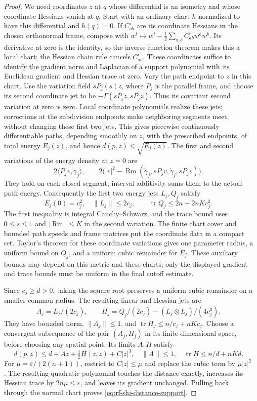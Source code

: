 \begin{proof}
We need coordinates $z$ at $q$ whose differential is an isometry and
whose coordinate Hessians vanish at $q$.  Start with an ordinary chart
$h$ normalized to have this differential and $h(q)=0$.  If $C^i_{ab}$
are its coordinate Hessians in the chosen orthonormal frame, compose
with $w^i\mapsto w^i-\tfrac12\sum_{a,b}C^i_{ab}w^aw^b$.
Its derivative at zero is the identity, so the inverse function theorem
makes this a local chart; the Hessian chain rule cancels $C^i_{ab}$.
These coordinates suffice to identify the gradient norm and Laplacian
of a support polynomial with its Euclidean gradient and Hessian trace
at zero.  Vary the path endpoint to $z$ in this chart.
Use the variation field $sP_j(s)z$, where $P_j$ is the parallel frame,
and choose its second coordinate jet to be
$-\Gamma(sP_jz,sP_jz)$.  Thus its covariant second variation at zero
is zero.  Local coordinate polynomials realize these jets; corrections
at the subdivision endpoints make neighboring segments meet, without
changing these first two jets.  This gives piecewise continuously
differentiable paths, depending smoothly on $z$, with
the prescribed endpoints, of total energy $E_j(z)$, and hence
$d(p,z)\leq\sqrt{E_j(z)}$.  The first and second variations of the
energy density at $z=0$ are
\[
 2\langle P_jv,\dot\gamma_j\rangle,\qquad
 2\bigl(|v|^2-
   \operatorname{Rm}(\dot\gamma_j,sP_jv,\dot\gamma_j,sP_jv)\bigr).
\]
They hold on each closed segment; interval additivity sums them to the
actual path energy.  Consequently the first two energy jets $L_j,Q_j$
satisfy
\[
 E_j(0)=c_j^2,\quad \|L_j\|\leq2c_j,\qquad
 \operatorname{tr}Q_j\leq2n+2nKc_j^2.
\]
The first inequality is integral Cauchy--Schwarz, and the trace bound
uses $0\leq s\leq1$ and $|\operatorname{Rm}|\leq K$ in the second
variation.  The finite chart cover and bounded path speeds and frame
matrices put the coordinate data in a compact set.  Taylor's theorem
for these coordinate variations gives one parameter radius, a uniform
bound on $Q_j$, and a uniform cubic remainder for $E_j$.  These auxiliary
bounds may depend on this metric and these charts; only the displayed
gradient and trace bounds must be uniform in the final cutoff estimate.

Since $c_j\geq d>0$, taking the square root preserves a uniform cubic
remainder on a smaller common radius.  The resulting linear and Hessian
jets are
\[
 A_j=L_j/(2c_j),\qquad
 H_j=Q_j/(2c_j)-(L_j\otimes L_j)/(4c_j^3).
\]
They have bounded norm, $\|A_j\|\leq1$, and
$\operatorname{tr}H_j\leq n/c_j+nKc_j$.  Choose a convergent subsequence
of the pair $(A_j,H_j)$ in its finite-dimensional space, before choosing
any spatial point.  Its limits $A,H$ satisfy
\[
 d(p,z)\leq d+Az+\tfrac12H(z,z)+C|z|^3,\quad
 \|A\|\leq1,\quad \operatorname{tr}H\leq n/d+nKd.
\]
For $\mu=\varepsilon/(2(n+1))$, restrict to $C|z|\leq\mu$ and replace
the cubic term by $\mu|z|^2$.  The resulting quadratic polynomial
touches the distance exactly, increases its Hessian trace by
$2n\mu\leq\varepsilon$, and leaves its gradient unchanged.  Pulling
back through the normal chart proves \eqref{eq:rf-shi-distance-support}.


\end{proof}
